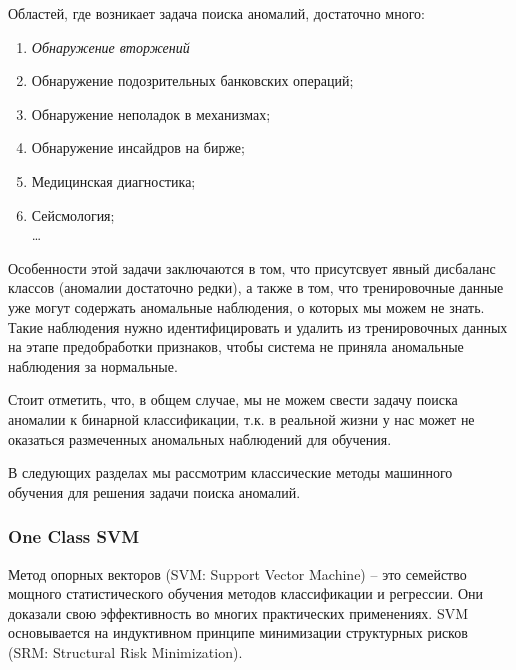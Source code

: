 \documentclass[12pt]{article}
\begin{document}
    \par Областей, где возникает задача поиска аномалий, достаточно много:

    \begin{enumerate}
        \item \textit{Обнаружение вторжений}
        \item Обнаружение подозрительных банковских операций;
        \item Обнаружение неполадок в механизмах;
        \item Обнаружение инсайдров на бирже;
        \item Медицинская диагностика;
        \item Сейсмология; \\
        \ldots
    \end{enumerate}

    \par Особенности этой задачи заключаются в том, что присутсвует явный дисбаланс классов (аномалии достаточно редки), а также в том, что тренировочные данные уже могут содержать аномальные наблюдения, о которых мы можем не знать. Такие наблюдения нужно идентифицировать и удалить из тренировочных данных на этапе предобработки признаков, чтобы система не приняла аномальные наблюдения за нормальные.
    
    \par Стоит отметить, что, в общем случае, мы не можем свести задачу поиска аномалии к бинарной классификации, т.к. в реальной жизни у нас может не оказаться размеченных аномальных наблюдений для обучения.

    \par В следующих разделах мы рассмотрим классические методы машинного обучения для решения задачи поиска аномалий.


    \subsubsection{One Class SVM}
    \label{sec:Research:Model:OneClassSVM}

    \par Метод опорных векторов (SVM: Support Vector Machine) -- это семейство мощного статистического обучения методов классификации и регрессии. Они доказали свою эффективность во многих практических применениях. SVM основывается на индуктивном принципе минимизации структурных рисков (SRM: Structural Risk Minimization).
\end{document}
